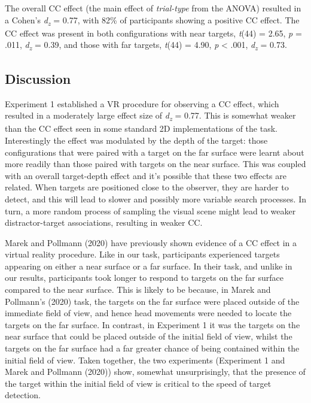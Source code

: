 \documentclass[
  english,
  man,floatsintext]{apa7}
\begin{document}
The overall CC effect (the main effect of \emph{trial-type} from the ANOVA) resulted in a Cohen's \emph{d\textsubscript{z}} = 0.77, with 82\% of participants showing a positive CC effect. The CC effect was present in both configurations with near targets, \emph{t}(44) = 2.65, \emph{p} = .011, \emph{d\textsubscript{z}} = 0.39, and those with far targets, \emph{t}(44) = 4.90, \emph{p} \textless{} .001, \emph{d\textsubscript{z}} = 0.73.

\hypertarget{discussion}{%
\subsection{Discussion}\label{discussion}}

Experiment 1 established a VR procedure for observing a CC effect, which resulted in a moderately large effect size of \emph{d\textsubscript{z}} = 0.77. This is somewhat weaker than the CC effect seen in some standard 2D implementations of the task. Interestingly the effect was modulated by the depth of the target: those configurations that were paired with a target on the far surface were learnt about more readily than those paired with targets on the near surface. This was coupled with an overall target-depth effect and it's possible that these two effects are related. When targets are positioned close to the observer, they are harder to detect, and this will lead to slower and possibly more variable search processes. In turn, a more random process of sampling the visual scene might lead to weaker distractor-target associations, resulting in weaker CC.

Marek and Pollmann (2020) have previously shown evidence of a CC effect in a virtual reality procedure. Like in our task, participants experienced targets appearing on either a near surface or a far surface. In their task, and unlike in our results, participants took longer to respond to targets on the far surface compared to the near surface. This is likely to be because, in Marek and Pollmann's (2020) task, the targets on the far surface were placed outside of the immediate field of view, and hence head movements were needed to locate the targets on the far surface. In contrast, in Experiment 1 it was the targets on the near surface that could be placed outside of the initial field of view, whilst the targets on the far surface had a far greater chance of being contained within the initial field of view. Taken together, the two experiments (Experiment 1 and Marek and Pollmann (2020)) show, somewhat unsurprisingly, that the presence of the target within the initial field of view is critical to the speed of target detection.
\end{document}
